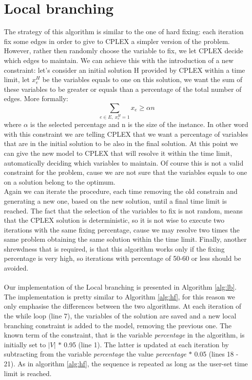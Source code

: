 \section{Local branching}
The strategy of this algorithm \cite{LB} is similar to the one of hard fixing: each iteration fix some edges in order to give to CPLEX a simpler version of the problem. However, rather then randomly choose the variable to fix, we let CPLEX decide which edges to maintain. We can achieve this with the introduction of a new constraint: let's consider an initial solution H provided by CPLEX within a time limit, let $x_e^H$ be the variables equals to one on this solution, we want the sum of these variables to be greater or equals than a percentage of the total number of edges. More formally:
\begin{equation*}
	\sum_{e \in E, \; x_e^H = 1} x_e \geq \alpha n
\end{equation*}
where $\alpha$ is the selected percentage and n is the size of the instance. In other word with this constraint we are telling CPLEX that we want a percentage of variables that are in the initial solution to be also in the final solution. At this point we can give the new model to CPLEX that will resolve it within the time limit, automatically deciding which variables to maintain.
Of course this is not a valid constraint for the problem, cause we are not sure that the variables equals to one on a solution belong to the optimum.\\
Again we can iterate the procedure, each time removing the old constrain and generating a new one, based on the new solution, until a final time limit is reached. The fact that the selection of the variables to fix is not random, means that the CPLEX solution is deterministic, so it is not wise to execute two iterations with the same fixing percentage, cause we may resolve two times the same problem obtaining the same solution within the time limit.
Finally, another shrewdness that is required, is that this algorithm works only if the fixing percentage is very high, so iterations with percentage of 50-60 or less should be avoided. 
\\\\ Our implementation of the Local branching is presented in Algorithm \ref{alg:lb}. The implementation is pretty similar to Algorithm \ref{alg:hf}, for this reason we only emphasise the differences between the two algorithms. 
At each iteration of the while loop (line 7), the variables of the solution are saved and a new local branching constraint is added to the model, removing the previous one. The known term of the constraint, that is the variable \textit{percentage} in the algorithm, is initially set to $|V|$ $\ast$ 0.95 (line 1). The latter is updated at each iteration by subtracting from the variable \textit{percentage} the value \textit{percentage} $\ast$ 0.05 (lines 18 - 21). As in algorithm \ref{alg:hf}, the sequence is repeated as long as the user-set time limit is reached.

